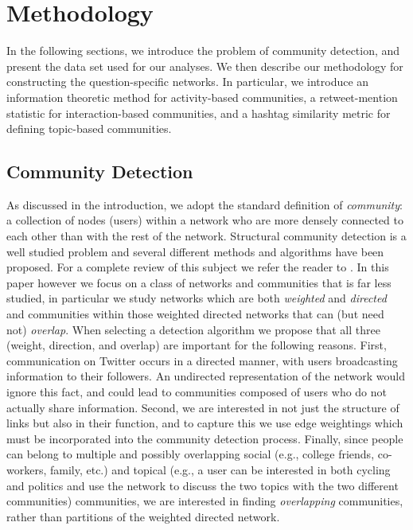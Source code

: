 \section{Methodology}

In the following sections, we introduce the problem of community detection, and present the data set used for our analyses. We then describe our methodology for constructing the question-specific networks. In particular, we introduce an information theoretic method for activity-based communities, a retweet-mention statistic for interaction-based communities, and a hashtag similarity metric for defining topic-based communities.

\subsection{Community Detection}

As discussed in the introduction, we adopt the standard definition of \emph{community}: a collection of nodes (users) within a network who are more densely connected to each other than with the rest of the network. Structural community detection is a well studied problem and several different methods and algorithms have been proposed. For a complete review of this subject we refer the reader to \cite{fortunato2010community}. In this paper however we focus on a class of networks and communities that is far less studied, in particular we study networks which are both \textit{weighted} and \textit{directed} and communities within those weighted directed networks that can (but need not) \emph{overlap}. When selecting a detection algorithm we propose that all three (weight, direction, and overlap) are important for the following reasons. First, communication on Twitter occurs in a directed manner, with users broadcasting information to their followers. An undirected representation of the network would ignore this fact, and could lead to communities composed of users who do not actually share information. Second, we are interested in not just the structure of links but also in their function, and to capture this we use edge weightings which must be incorporated into the community detection process. Finally, since people can belong to multiple and possibly overlapping social (e.g., college friends, co-workers, family, etc.) and topical (e.g., a user can be interested in both cycling and politics and use the network to discuss the two topics with the two different communities) communities, we are interested in finding \textit{overlapping} communities, rather than partitions of the weighted directed network. 

